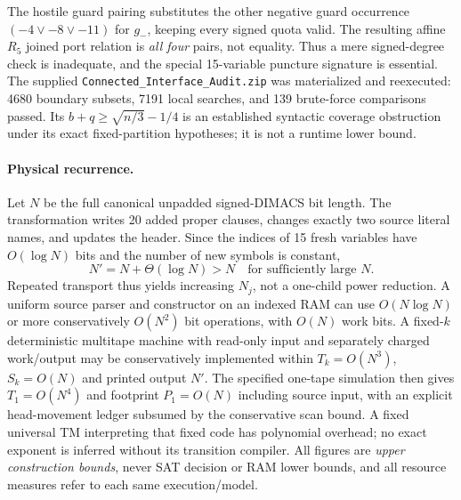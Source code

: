 \documentclass[11pt]{article}
\begin{document}
The hostile guard pairing substitutes the other negative guard occurrence $(-4\vee-8\vee-11)$ for $g_-$, keeping every signed quota valid. The resulting affine $R_5$ joined port relation is \emph{all four} pairs, not equality. Thus a mere signed-degree check is inadequate, and the special 15-variable puncture signature is essential. The supplied \texttt{Connected\_Interface\_Audit.zip} was materialized and reexecuted: 4680 boundary subsets, 7191 local searches, and 139 brute-force comparisons passed. Its $b+q\ge\sqrt{n/3}-1/4$ is an established syntactic coverage obstruction under its exact fixed-partition hypotheses; it is not a runtime lower bound.

\paragraph{Physical recurrence.} Let $N$ be the full canonical unpadded signed-DIMACS bit length. The transformation writes 20 added proper clauses, changes exactly two source literal names, and updates the header. Since the indices of 15 fresh variables have $O(\log N)$ bits and the number of new symbols is constant,
\[N'=N+\Theta(\log N)>N\quad\text{for sufficiently large }N.\]
Repeated transport thus yields increasing $N_j$, not a one-child power reduction. A uniform source parser and constructor on an indexed RAM can use $O(N\log N)$ or more conservatively $O(N^2)$ bit operations, with $O(N)$ work bits. A fixed-$k$ deterministic multitape machine with read-only input and separately charged work/output may be conservatively implemented within $T_k=O(N^3)$, $S_k=O(N)$ and printed output $N'$. The specified one-tape simulation then gives $T_1=O(N^4)$ and footprint $P_1=O(N)$ including source input, with an explicit head-movement ledger subsumed by the conservative scan bound. A fixed universal TM interpreting that fixed code has polynomial overhead; no exact exponent is inferred without its transition compiler. All figures are \emph{upper construction bounds}, never SAT decision or RAM lower bounds, and all resource measures refer to each same execution/model.
\end{document}
